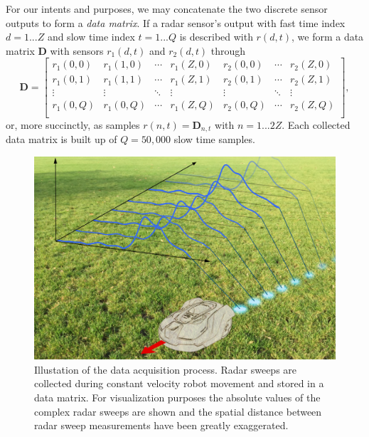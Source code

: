 For our intents and purposes, we may concatenate the two discrete sensor outputs to form a \emph{data matrix}. If a radar sensor's output with fast time index $d=1...Z$ and slow time index $t=1...Q$ is described with $r(d,t)$, we form a data matrix $\mathbf{D}$ with sensors $r_1(d,t)$ and $r_2(d,t)$ through
\begin{equation}
	\mathbf{D}= 
	\begin{bmatrix}
		r_1(0,0) & r_1(1,0) & \cdots & r_1(Z,0) & r_2(0,0) & \cdots & r_2(Z,0) \\
		r_1(0,1) & r_1(1,1) & \cdots & r_1(Z,1) & r_2(0,1) & \cdots & r_2(Z,1) \\
		\vdots &  \vdots & \ddots & \vdots & \vdots & \ddots &  \vdots \\
		r_1(0,Q) & r_1(0,Q) & \cdots  & r_1(Z,Q) & r_2(0,Q) & \cdots  & r_2(Z,Q) \\
	\end{bmatrix}
	,
\end{equation}
or, more succinctly, as samples $r(n,t) = \mathbf{D}_{n,t}$ with $n=1...2Z$. Each collected data matrix is built up of $Q=50,000$ slow time samples.

\begin{figure}
	\centering
	\includegraphics[scale=0.60]{figs_temp/data_collecting.jpg}
	\caption{Illustation of the data acquisition process. Radar sweeps are collected during constant velocity robot movement and stored in a data matrix. For visualization purposes the absolute values of the complex radar sweeps are shown and the spatial distance between radar sweep measurements have been greatly exaggerated.}
	\label{fig:data_collecting}
\end{figure}

